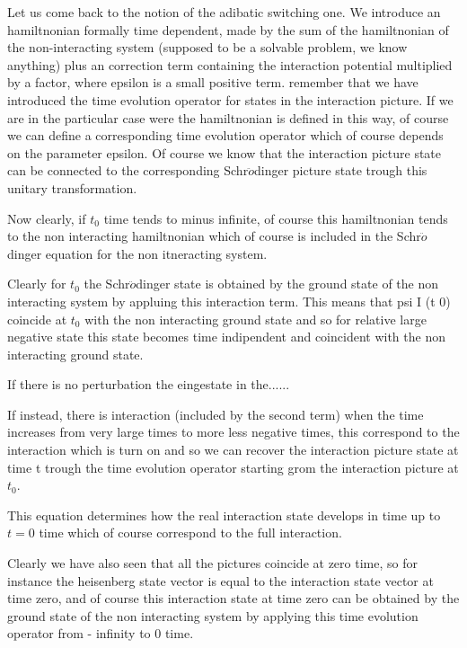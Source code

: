 \documentclass[../main/main.tex]{subfiles}
\begin{document}

Let us come back to the notion of the adibatic switching one. We introduce an hamiltnonian formally time dependent, made by the sum of the hamiltnonian of the non-interacting system (supposed to be a solvable problem, we know anything) plus an correction term containing the interaction potential multiplied by a factor, where epsilon is a small positive term.
remember that we have introduced the time evolution operator for states in the interaction picture. If we are in the particular case were the hamiltnonian is defined in this way, of course we can define a corresponding time evolution operator which of course depends on the parameter epsilon. Of course we know that the interaction picture state can be connected to the corresponding Schr$\ddot{o}$dinger picture state trough this unitary transformation.


Now clearly, if \( t_0 \) time tends to minus infinite, of course this hamiltnonian tends to the non interacting hamiltnonian which of course is included in the Schr$\ddot{o}$dinger equation for the non itneracting system.

Clearly for \( t_0 \) the Schr$\ddot{o}$dinger state is obtained by the ground state of the non interacting system by appluing this interaction term. This means that psi I (t 0) coincide at \( t_0 \) with the non interacting ground state and so for relative large negative state this state becomes time indipendent and coincident with the non interacting ground state.

If there is no perturbation the eingestate in the......


If instead, there is interaction (included by the second term) when the time increases from very large times to more less negative times, this correspond to the interaction which is turn on and so we can recover the interaction picture state at time t trough the time evolution operator starting grom the interaction picture at \( t_0 \).

This equation determines how the real interaction state develops in time up to \( t=0 \) time which of course correspond to the full interaction.


Clearly we have also seen that all the pictures coincide at zero time, so for instance the heisenberg state vector is equal to the interaction state vector at time zero, and of course this interaction state at time zero can be obtained by the ground state of the non interacting system by applying this time evolution operator from - infinity to 0 time.
\end{document}
